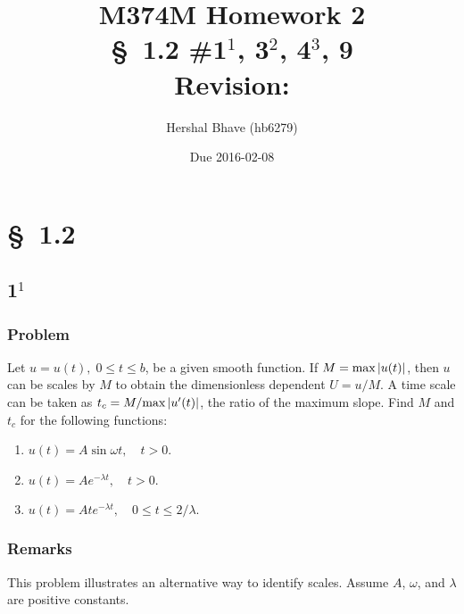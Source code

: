 \documentclass[12pt,twoside]{article}
\title{M374M Homework 2 \\
  \normalsize{\S~1.2 \#1$^1$, 3$^2$, 4$^3$, 9} \\
  Revision: }
\author{Hershal Bhave (hb6279)}
\date{Due 2016-02-08}
\begin{document}
\maketitle
\section{\S~1.2}
\subsection{1$^1$}
\subsubsection*{Problem}
Let $u=u(t),\;0 \le t \le b$, be a given smooth function. If
$M=\text{max}\left|{u(t)}\right|$, then $u$ can be scales by $M$ to obtain the
dimensionless dependent $U=u/M$. A time scale can be taken as
$t_c=M/\text{max}\left|{u'(t)}\right|$, the ratio of the maximum slope. Find $M$ and
$t_c$ for the following functions:
\begin{enumerate}
\item $u(t)=A\sin\omega t, \quad t>0$.
\item $u(t)=Ae^{-\lambda t},\quad t>0$.
\item $u(t)=Ate^{-\lambda t},\quad 0 \le t \le 2/\lambda.$
\end{enumerate}

\subsubsection*{Remarks}
This problem illustrates an alternative way to identify scales. Assume $A$,
$\omega$, and $\lambda$ are positive constants.
\end{document}
